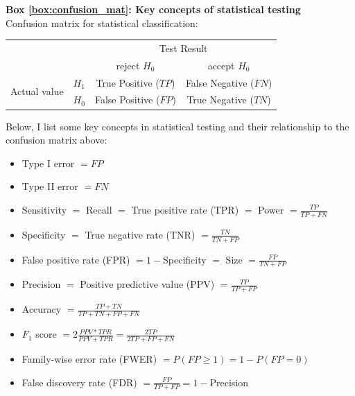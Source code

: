 
\newpage

\begin{Comment}
\hspace{-2.5mm}\textbf{Box \ref{box:confusion_mat}: Key concepts of statistical testing}\label{box:confusion_mat}\\
Confusion matrix for statistical classification:

\begin{center}
\begin{tabular}{l|l|c|c|}
\multicolumn{2}{c}{}&\multicolumn{2}{c}{Test Result}\\
\cline{3-4}
\multicolumn{2}{c|}{}&reject $H_0$&accept $H_0$\\
\cline{2-4}
\multirow{2}{*}{Actual value}& $H_1$ & True Positive ($TP$) & False Negative ($FN$)\\
\cline{2-4}
& $H_0$ & False Positive ($FP$) & True Negative ($TN$)\\
\cline{2-4}
\end{tabular}
\end{center}

\vspace{3mm}
Below, I list some key concepts in statistical testing and their relationship to the confusion matrix above:

\begin{itemize}
    \item Type I error $= FP$
    \item Type II error $= FN$
    \item Sensitivity $=$ Recall $=$ True positive rate (TPR) $=$ Power $=\frac{TP}{TP+FN}$
    \item Specificity $=$ True negative rate (TNR) $=\frac{TN}{TN+FP}$
    \item False positive rate (FPR) $= 1-$Specificity $=$ Size $=\frac{FP}{TN+FP}$
    \item Precision $=$ Positive predictive value (PPV) $=\frac{TP}{TP+FP}$
    \item Accuracy $=\frac{TP+TN}{TP+TN+FP+FN}$
    \item $F_1$ score $=2 \frac{PPV*TPR}{PPV+TPR}=\frac{2TP}{2TP+FP+FN}$
    \item Family-wise error rate (FWER) $=P(FP \geq 1)= 1 - P(FP=0)$
    \item False discovery rate (FDR) $=\frac{FP}{TP+FP}= 1- $Precision
\end{itemize}

\vfill

\end{Comment}

